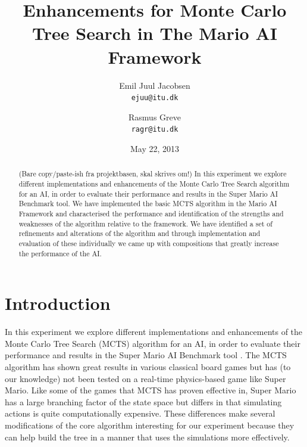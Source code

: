 \documentclass[10pt,a4paper]{article}
\begin{document}
\title{Enhancements for Monte Carlo Tree Search in The Mario AI Framework}
\date{May 22, 2013}
\author{Emil Juul Jacobsen\\\texttt{ejuu@itu.dk}        
        \and Rasmus Greve\\\texttt{ragr@itu.dk}}
\maketitle
\thispagestyle{empty} %

\begin{abstract}
(Bare copy/paste-ish fra projektbasen, skal skrives om!) %
In this experiment we explore different implementations and enhancements of the Monte Carlo Tree Search algorithm for an AI, in order to evaluate their performance and results in the Super Mario AI Benchmark tool. 
We have implemented the basic MCTS algorithm in the Mario AI 
Framework and characterised the performance and identification of 
the strengths and weaknesses of the algorithm relative to the 
framework. We have identified a set of refinements and alterations of the algorithm 
and through implementation and evaluation of these individually we came up
with compositions that greatly increase the performance of the AI.
\end{abstract}
\clearpage

\tableofcontents
\clearpage

\section{Introduction}
In this experiment we explore different implementations and enhancements of the Monte Carlo Tree Search (MCTS) algorithm for an AI, in order to evaluate their performance and results in the Super Mario AI Benchmark tool \cite{mario}. The MCTS algorithm has shown great results in various classical board games but has (to our knowledge) not been tested on a real-time physics-based game like Super Mario. Like some of the games that MCTS has proven effective in, Super Mario has a large branching factor of the state space but differs in that simulating actions is quite computationally expensive. These differences make several modifications of the core algorithm interesting for our experiment because they can help build the tree in a manner that uses the simulations more effectively. %
\clearpage
\end{document}
